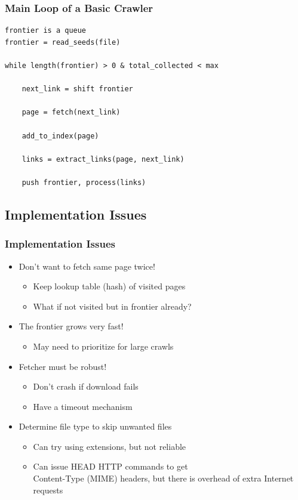\documentclass{beamer}
\begin{document}
\begin{frame}[fragile] \frametitle{Main Loop of a Basic Crawler }
 
\begin{verbatim}
frontier is a queue
frontier = read_seeds(file)

while length(frontier) > 0 & total_collected < max

    next_link = shift frontier

    page = fetch(next_link)

    add_to_index(page)

    links = extract_links(page, next_link)

    push frontier, process(links)

\end{verbatim}

\end{frame}

\subsection{Implementation Issues}

\begin{frame} \frametitle{Implementation Issues}

\begin{itemize}

\item Don't want to fetch same page twice!
\begin{itemize}
\item Keep lookup table (hash) of visited pages
\item What if not visited but in frontier already?
\end{itemize}

\item The frontier grows very fast!
\begin{itemize}
\item May need to prioritize for large crawls
\end{itemize}

\item Fetcher must be robust! 
\begin{itemize}
\item Don't crash if download fails
\item Have a timeout mechanism
\end{itemize}

\item Determine file type to skip unwanted files
\begin{itemize}
\item Can try using extensions, but not reliable
\item Can issue HEAD HTTP commands to get \\ Content-Type (MIME)
  headers, but there is overhead of extra Internet requests
\end{itemize}

\end{itemize}

\end{frame}
\end{document}
